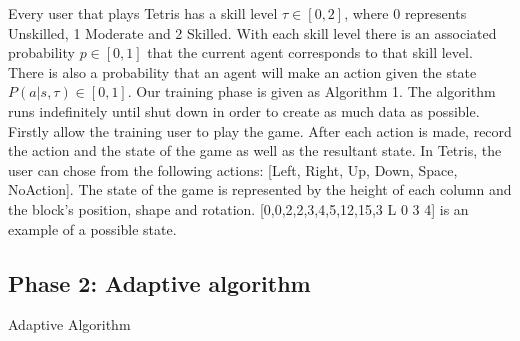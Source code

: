 \documentclass[11pt, conference, compsoc]{IEEEtran}
\makeatletter
\def\BState{\State\hskip-\ALG@thistlm}
\let\MYoriglatexcaption\caption
\renewcommand{\caption}[2][\relax]{\MYoriglatexcaption[#2]{#2}}
\makeatother
\begin{document}
Every user that plays Tetris has a skill level $\tau \in [0,2]$, where 0 represents Unskilled, 1 Moderate and 2 Skilled. With each skill level there is an associated probability $p \in [0,1]$ that the current agent corresponds to that skill level. There is also a probability that an agent will make an action given the state $P(a |s, \tau  ) \in [0,1]$. Our training phase is given as Algorithm 1. The algorithm runs indefinitely until shut down in order to create as much data as possible. Firstly allow the training user to play the game. After each action is made, record the action and the state of the game as well as the resultant state. In Tetris, the user can chose from the following actions: [Left, Right, Up, Down, Space, NoAction]. The state of the game is represented by the height of each column and the block's position, shape and rotation. [0,0,2,2,3,4,5,12,15,3 L 0 3 4] is an example of a possible state. 

\subsection{    Phase 2: Adaptive algorithm}
\begin{algorithm}
\caption{Adaptive Algorithm}\label{euclid}
\end{algorithm}
\end{document}
